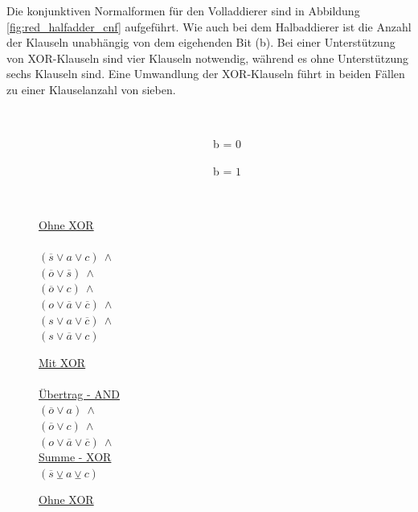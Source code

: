 Die konjunktiven Normalformen für den Volladdierer sind in Abbildung \ref{fig:red_halfadder_cnf} aufgeführt. Wie auch bei dem Halbaddierer ist die Anzahl
der Klauseln unabhängig von dem eigehenden Bit (b). Bei einer Unterstützung von XOR-Klauseln sind vier Klauseln notwendig, während es ohne Unterstützung
sechs Klauseln sind. Eine Umwandlung der XOR-Klauseln führt in beiden Fällen zu einer Klauselanzahl von sieben.
\begin{figure}[!h]
  \centering
  \begin{minipage}[c]{0.3cm}
    ~
  \end{minipage}
  \begin{minipage}[c]{7.1cm}
    ~~~~~~~~~~~~~~~~~~~~~~~~~~~~~~~b = $0$
  \end{minipage}
  \begin{minipage}[c]{7cm}
    ~~~~~~~~~~~~~~~~~~~~~~~~~~~~~~~b = $1$
  \end{minipage}
  \begin{minipage}[l]{0.4cm}
    ~
  \end{minipage}
  \begin{minipage}[l]{3.5cm}
    \underline{Ohne XOR}\\
    ~\\
    $ (\overline{s} \vee a \vee c) ~ \wedge $\\
    $ (\overline{o} \vee \overline{s}) ~ \wedge $\\
    $ (\overline{o} \vee c) ~ \wedge $\\
    $ (o \vee \overline{a} \vee \overline{c}) ~ \wedge $\\
    $ (s \vee a \vee \overline{c}) ~ \wedge $\\
    $ (s \vee \overline{a} \vee c) $
  \end{minipage}
  \begin{minipage}[l]{3.5cm}
    \underline{Mit XOR}\\
    ~\\
    \underline{Übertrag - AND}\\
    $ (\overline{o} \vee a) ~ \wedge $\\
    $ (\overline{o} \vee c) ~ \wedge $\\
    $ (o \vee \overline{a} \vee \overline{c}) ~ \wedge $\\
    \underline{Summe - XOR}\\
    $ (\overline{s} \veebar a \veebar c) $
  \end{minipage}
  \begin{minipage}[l]{3.5cm}
    \underline{Ohne XOR}\\

\end{minipage}
\end{figure}
